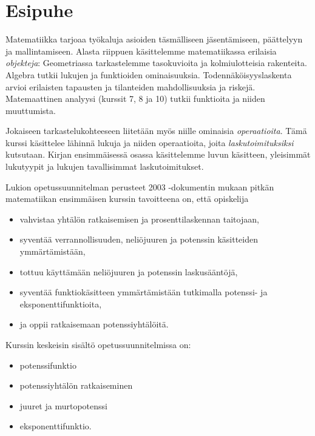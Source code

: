 
\chapter{Esipuhe}



Matematiikka tarjoaa työkaluja asioiden täsmälliseen jäsentämiseen, päättelyyn ja mallintamiseen. Alasta riippuen käsittelemme matematiikassa erilaisia \emph{objekteja}: Geometriassa tarkastelemme tasokuvioita ja kolmiulotteisia rakenteita. Algebra tutkii lukujen ja funktioiden ominaisuuksia. Todennäköisyyslaskenta arvioi erilaisten tapausten ja tilanteiden mahdollisuuksia ja riskejä. Matemaattinen analyysi (kurssit 7, 8 ja 10) tutkii funktioita ja niiden muuttumista.

Jokaiseen tarkastelukohteeseen liitetään myös niille ominaisia \emph{operaatioita}. Tämä kurssi käsittelee lähinnä lukuja ja niiden operaatioita, joita \emph{laskutoimituksiksi} kutsutaan. Kirjan ensimmäisessä osassa käsittelemme luvun käsitteen, yleisimmät lukutyypit ja lukujen tavallisimmat laskutoimitukset.

Lukion opetussuunnitelman perusteet 2003 -dokumentin mukaan pitkän matematiikan ensimmäisen kurssin tavoitteena on, että opiskelija 
\begin{itemize}
\item vahvistaa yhtälön ratkaisemisen ja prosenttilaskennan taitojaan,
\item syventää verrannollisuuden, neliöjuuren ja potenssin käsitteiden ymmärtämistään,
\item tottuu käyttämään neliöjuuren ja potenssin laskusääntöjä,
\item syventää funktiokäsitteen ymmärtämistään tutkimalla potenssi- ja eksponenttifunktioita,
\item ja oppii ratkaisemaan potenssiyhtälöitä.
\end{itemize}
Kurssin keskeisin sisältö opetussuunnitelmissa on:
\begin{itemize}
\item potenssifunktio
\item potenssiyhtälön ratkaiseminen
\item juuret ja murtopotenssi
\item eksponenttifunktio.
\end{itemize}

